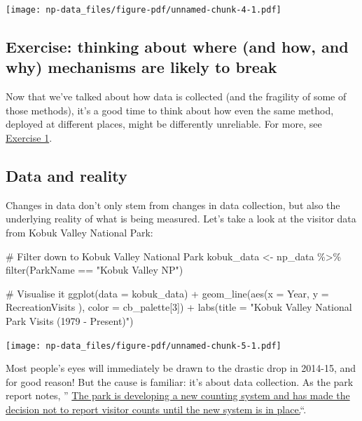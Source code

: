 \documentclass[
  letterpaper,
  DIV=11,
  numbers=noendperiod]{scrartcl}
\newenvironment{Shaded}{\begin{snugshade}}{\end{snugshade}}
\newcommand{\AttributeTok}[1]{\textcolor[rgb]{0.40,0.45,0.13}{#1}}
\newcommand{\CommentTok}[1]{\textcolor[rgb]{0.37,0.37,0.37}{#1}}
\newcommand{\DecValTok}[1]{\textcolor[rgb]{0.68,0.00,0.00}{#1}}
\newcommand{\FunctionTok}[1]{\textcolor[rgb]{0.28,0.35,0.67}{#1}}
\newcommand{\NormalTok}[1]{\textcolor[rgb]{0.00,0.23,0.31}{#1}}
\newcommand{\OtherTok}[1]{\textcolor[rgb]{0.00,0.23,0.31}{#1}}
\newcommand{\SpecialCharTok}[1]{\textcolor[rgb]{0.37,0.37,0.37}{#1}}
\newcommand{\StringTok}[1]{\textcolor[rgb]{0.13,0.47,0.30}{#1}}
\begin{document}
\texttt{[image: np-data\_files/figure-pdf/unnamed-chunk-4-1.pdf]}

\subsection{Exercise: thinking about where (and how, and why) mechanisms
are likely to
break}\label{exercise-thinking-about-where-and-how-and-why-mechanisms-are-likely-to-break}

Now that we've talked about how data is collected (and the fragility of
some of those methods), it's a good time to think about how even the
same method, deployed at different places, might be differently
unreliable. For more, see \hyperref[exercise-1]{Exercise 1}.

\subsection{Data and reality}\label{data-and-reality}

Changes in data don't only stem from changes in data collection, but
also the underlying reality of what is being measured. Let's take a look
at the visitor data from Kobuk Valley National Park:

\begin{Shaded}
\begin{Highlighting}[]
\CommentTok{\# Filter down to Kobuk Valley National Park}
\NormalTok{kobuk\_data }\OtherTok{\textless{}{-}}\NormalTok{ np\_data }\SpecialCharTok{\%\textgreater{}\%} \FunctionTok{filter}\NormalTok{(ParkName }\SpecialCharTok{==} \StringTok{"Kobuk Valley NP"}\NormalTok{)}

\CommentTok{\# Visualise it}
\FunctionTok{ggplot}\NormalTok{(}\AttributeTok{data =}\NormalTok{ kobuk\_data) }\SpecialCharTok{+} 
  \FunctionTok{geom\_line}\NormalTok{(}\FunctionTok{aes}\NormalTok{(}\AttributeTok{x =}\NormalTok{ Year, }\AttributeTok{y =}\NormalTok{ RecreationVisits ), }\AttributeTok{color =}\NormalTok{ cb\_palette[}\DecValTok{3}\NormalTok{]) }\SpecialCharTok{+}
  \FunctionTok{labs}\NormalTok{(}\AttributeTok{title =} \StringTok{"Kobuk Valley National Park Visits (1979 {-} Present)"}\NormalTok{)}
\end{Highlighting}
\end{Shaded}

\texttt{[image: np-data\_files/figure-pdf/unnamed-chunk-5-1.pdf]}

Most people's eyes will immediately be drawn to the drastic drop in
2014-15, and for good reason! But the cause is familiar: it's about data
collection. As the park report notes, ''
\href{https://irma.nps.gov/Stats/SSRSReports/Park\%20Specific\%20Reports/Monthly\%20Visitation\%20Comments\%20By\%20Park?Park=MORA}{The
park is developing a new counting system and has made the decision not
to report visitor counts until the new system is in place.}``.
\end{document}
